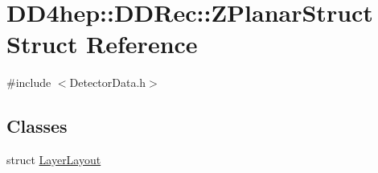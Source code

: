 \hypertarget{struct_d_d4hep_1_1_d_d_rec_1_1_z_planar_struct}{
\section{DD4hep::DDRec::ZPlanarStruct Struct Reference}
\label{struct_d_d4hep_1_1_d_d_rec_1_1_z_planar_struct}
}


{\ttfamily \#include $<$DetectorData.h$>$}\subsection*{Classes}
\begin{DoxyCompactItemize}
\item 
struct \hyperlink{struct_d_d4hep_1_1_d_d_rec_1_1_z_planar_struct_1_1_layer_layout}{LayerLayout}
\end{DoxyCompactItemize}
